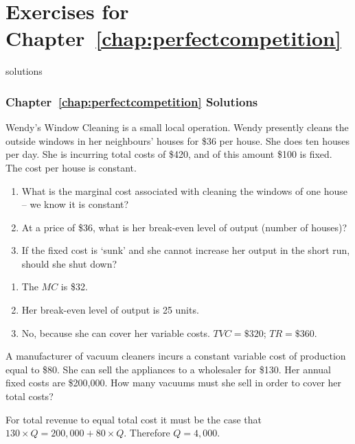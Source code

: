 \newpage
\section*{Exercises for Chapter~\ref{chap:perfectcompetition}}

\begin{Filesave}{solutions}
\subsubsection*{Chapter~\ref{chap:perfectcompetition} Solutions}
\end{Filesave}

\begin{enumialphparenastyle}

\begin{econex}\label{ex:ch9ex1}
Wendy's Window Cleaning is a small local operation. Wendy presently cleans the outside windows in her neighbours' houses for \$36 per house. She does ten houses per day. She is incurring total costs of \$420, and of this amount \$100 is fixed. The cost per house is constant.
\begin{enumerate}
\item	What is the marginal cost associated with cleaning the windows of one house -- we know it is constant?
\item	At a price of \$36, what is her break-even level of output (number of houses)?
\item	If the fixed cost is `sunk' and she cannot increase her output in the short run, should she shut down?
\end{enumerate}
\begin{econsolution}
\begin{enumerate}
\item	The $MC$ is \$32.
\item	Her break-even level of output is 25 units.
\item	No, because she can cover her variable costs. $TVC=\$320$; $TR=\$360$.
\end{enumerate}
\end{econsolution}
\end{econex}

\begin{econex}\label{ex:ch9ex2}
A manufacturer of vacuum cleaners incurs a constant variable cost of production equal to \$80. She can sell the appliances to a wholesaler for \$130. Her annual fixed costs are \$200,000.	How many vacuums must she sell in order to cover her total costs?
\begin{econsolution}
For total revenue to equal total cost it must be the case that $130\times Q=200,000+80\times Q$. Therefore $Q=4,000$.


\end{econsolution}
\end{econex}
\end{enumialphparenastyle}
